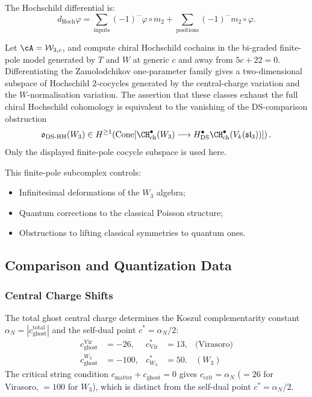 The Hochschild differential is:
\begin{equation}
d_{\text{Hoch}} \varphi = \sum_{\text{inputs}} (-1)^{\cdots} \varphi \circ m_2 + \sum_{\text{positions}} (-1)^{\cdots} m_2 \circ \varphi.
\end{equation}

\begin{proposition}
Let\/ $\cA=\mathcal W_{3,c}$, and compute chiral Hochschild cochains
in the bi-graded finite-pole model generated by $T$ and $W$ at generic
$c$ and away from $5c+22=0$. Differentiating the Zamolodchikov
one-parameter family gives a two-dimensional subspace of Hochschild
$2$-cocycles generated by the central-charge variation and the
$W$-normalisation variation. The assertion that these classes exhaust
the full chiral Hochschild cohomology is equivalent to the vanishing of
the DS-comparison obstruction
\[
 \mathfrak{o}_{\mathrm{DS\text{-}HH}}(W_3)
 \in
 H^{\ge 1}\!\left(
 \operatorname{Cone}\!\left[
 \CH^\bullet_{\mathrm{ch}}(W_3)
 \longrightarrow
 H^\bullet_{\mathrm{DS}}
 \CH^\bullet_{\mathrm{ch}}(V_k(\mathfrak{sl}_3))
 \right]\right).
\]
Only the displayed finite-pole cocycle subspace is used here.
\end{proposition}

This finite-pole subcomplex controls:
\begin{itemize}
\item Infinitesimal deformations of the $W_3$ algebra;
\item Quantum corrections to the classical Poisson structure;
\item Obstructions to lifting classical symmetries to quantum ones.
\end{itemize}


\subsection{Comparison and Quantization Data}

\subsubsection{Central Charge Shifts}

The total ghost central charge determines the Koszul complementarity
constant $\alpha_N = |c_{\mathrm{ghost}}^{\mathrm{total}}|$
and the self-dual point $c^* = \alpha_N/2$:
\begin{align}
c_{\mathrm{ghost}}^{\mathrm{Vir}} &= -26, &
 c^*_{\mathrm{Vir}} &= 13, & \text{(Virasoro)}\\
c_{\mathrm{ghost}}^{W_3} &= -100, &
 c^*_{W_3} &= 50. & (W_3)
\end{align}
The critical string condition $c_{\mathrm{matter}} + c_{\mathrm{ghost}} = 0$
gives $c_{\mathrm{crit}} = \alpha_N$ ($= 26$ for Virasoro, $= 100$ for
$W_3$), which is distinct from the self-dual point $c^* = \alpha_N/2$.

